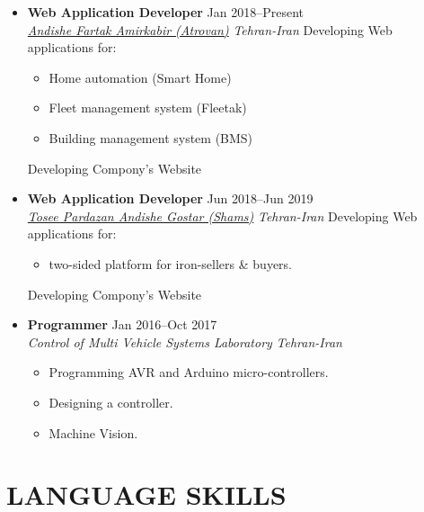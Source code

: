 \documentclass[10pt,a4paper,sans]{moderncv} %
\newcommand*{\authorimg}[1]{%
	\raisebox{-.3\baselineskip}{%
		\texttt{[image: \#1]}%
	}%
}
\begin{document}
\begin{itemize}
	
\item \textbf{Web Application Developer} \hfill Jan 2018--Present \\
\href{http://atrovan.com}{\authorimg{pictures/atrovan.png} \emph{Andishe Fartak Amirkabir (Atrovan)}} \hfill \emph{Tehran-Iran}
\vspace{1mm}
\linebreak
Developing Web applications for:
\begin{itemize}
	\item Home automation (Smart Home)
	\item Fleet management system (Fleetak)
	\item Building management system (BMS)
\end{itemize}
Developing Compony's Website

\item \textbf{Web Application Developer} \hfill Jun 2018--Jun 2019 \\
\href{http://shamstech.ir}{\authorimg{pictures/shams.png} \emph{Tosee Pardazan Andishe Gostar (Shams)}} \hfill \emph{Tehran-Iran}
\vspace{1mm}
\linebreak
Developing Web applications for:
\begin{itemize}
	\item two-sided platform for iron-sellers \& buyers.
\end{itemize}
Developing Compony's Website

\item \textbf{Programmer} \hfill Jan 2016--Oct 2017 \\
\authorimg{pictures/aut.png} \emph{Control of Multi Vehicle Systems Laboratory} \hfill \emph{Tehran-Iran}

\begin{itemize}
	\item Programming AVR and Arduino micro-controllers.  
	\item Designing a controller.
	\item Machine Vision.
\end{itemize}
	
\end{itemize}


\section{LANGUAGE SKILLS}
\end{document}
